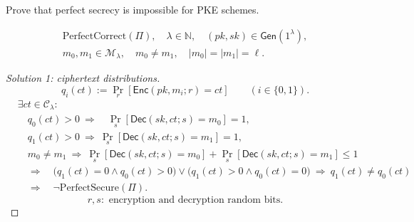 \documentclass[12pt,a4paper]{article}
\begin{document}
\setcounter{problem}{2}
\begin{problem}
Prove that perfect secrecy is impossible for PKE schemes.
\end{problem}
\[
\begin{aligned}
\mathrm{PerfectCorrect}(\Pi),\quad
\lambda\in\mathbb{N},\quad (pk,sk)\in\mathsf{Gen}(1^\lambda),\\
m_0,m_1\in\mathcal{M}_\lambda,\quad m_0\ne m_1,\quad |m_0|=|m_1|=\ell.
\end{aligned}
\]
\begin{proof}[Solution 1: ciphertext distributions]
\[
q_i(ct):=\Pr_r[\mathsf{Enc}(pk,m_i;r)=ct]\qquad(i\in\{0,1\}).
\]
\[
\begin{aligned}
&\exists ct\in\mathcal{C}_\lambda:\\
&\quad q_0(ct)>0\ \Longrightarrow\quad
\Pr_s[\mathsf{Dec}(sk,ct;s)=m_0]=1,\\
&\quad q_1(ct)>0\ \Longrightarrow\
\Pr_s[\mathsf{Dec}(sk,ct;s)=m_1]=1,\\
&\quad m_0\ne m_1\ \Longrightarrow\
\Pr_s[\mathsf{Dec}(sk,ct;s)=m_0]
+\Pr_s[\mathsf{Dec}(sk,ct;s)=m_1]\le1\\
&\quad\Longrightarrow\quad
\bigl(q_1(ct)=0\land q_0(ct)>0\bigr)
\lor\bigl(q_1(ct)>0\land q_0(ct)=0\bigr)
\ \Longrightarrow\ q_1(ct)\ne q_0(ct)\\
&\quad\Longrightarrow\quad\neg\mathrm{PerfectSecure}(\Pi).
\end{aligned}
\]
\[
r,s:\text{ encryption and decryption random bits}.
\]
\end{proof}
\end{document}
